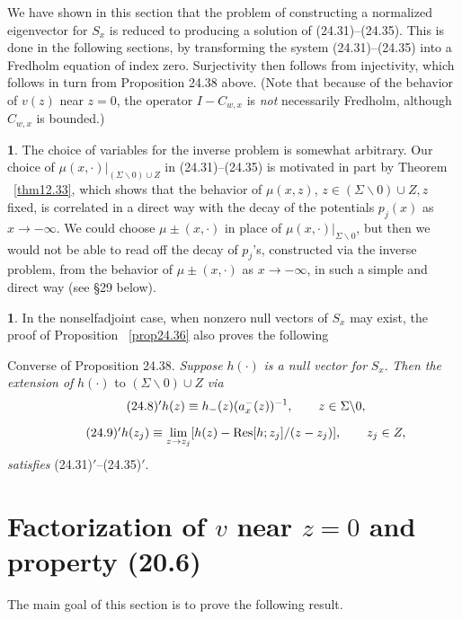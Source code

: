 \documentclass{surv-l}
\theoremstyle{plain}
\theoremstyle{definition}
\newtheorem{remark}[theorem]{\sc{Remark}}
\numberwithin{equation}{chapter}
\begin{document}
We have shown in this section that the problem of constructing a normalized eigenvector for $S_{x}$ is reduced to producing a solution of (24.31)--(24.35). This is done in the following sections, by transforming the system (24.31)--(24.35) into a Fredholm equation of index zero. Surjectivity then follows from injectivity, which follows in turn from Proposition 24.38 above. (Note that because of the behavior of $v(z)$ near $z=0$, the operator $I-C_{w,x}$ is \emph{not} necessarily Fredholm, although $C_{w,x}$ is bounded.)

\begin{remark}\label{rem24.40}
The choice of variables for the inverse problem is somewhat arbitrary. Our choice of $\mu(x,\cdot)|_{(\Sigma\backslash 0)\cup Z}$ in (24.31)--(24.35) is motivated in part by Theorem ~\ref{thm12.33}, which shows that the behavior of $\mu(x, z)$, $z\in(\Sigma\backslash 0)\cup Z, z$ fixed, is correlated in a direct way with the decay of the potentials $p_{j}(x)$ as $ x\rightarrow-\infty$. We could choose $\mu\pm(x,\cdot)$ in place of $\mu(x, \cdot)|_{\Sigma\backslash 0}$, but then we would not be able to read off the decay of $p_{j}$'s, constructed via the inverse problem, from the behavior of $\mu\pm(x, \cdot)$ as $x\rightarrow-\infty$, in such a simple and direct way (see \S 29 below).
\end{remark}

\begin{remark}\label{rem24.41}
In the nonselfadjoint case, when nonzero null vectors of $S_{x}$ may exist, the proof of Proposition ~\ref{prop24.36} also proves the following
\end{remark}

{\sc Converse of Proposition 24.38.}
\emph{Suppose} $h(\cdot)$ \emph{is a null vector for} $S_{x}$. \emph{Then the extension of} $h(\cdot)$ to $(\Sigma\backslash 0)\cup Z$ \emph{via}
\begin{equation*}
\tag*{$(24.8)^{\prime}$}  h(z)\equiv h_{-}(z)(a_{x}^{-}(z))^{-1},\qquad z\in\Sigma\backslash 0,
\end{equation*}

\begin{equation*}
\tag*{$(24.9)^{\prime}$}  h(z_{j})\displaystyle \equiv\lim_{z\rightarrow z_{j}}[h(z)-{\mathrm{Res}}[h;z_{j}]/(z-z_{j})],\qquad z_{j}\in Z,
\end{equation*}
\emph{satisfies} (24.31)$'$--(24.35)$'$.


\section{Factorization of $v$ near $z=0$ and property (20.6)}\label{sec25} The main goal of this section is to prove the following result.
\end{document}

